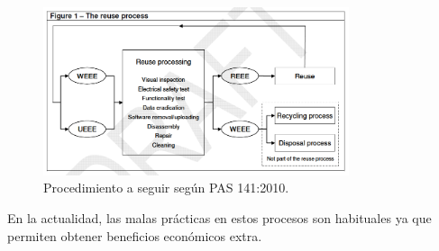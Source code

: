 \begin{figure}[H]
\begin{center}
\includegraphics[width=0.8\textwidth]{img/reciclaje-weee}
\caption{Procedimiento a seguir según PAS 141:2010.}
\end{center}
\end{figure}

En la actualidad, las malas prácticas en estos procesos son habituales ya que permiten obtener beneficios económicos extra.